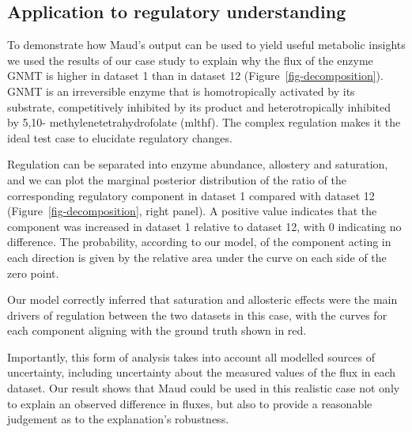\documentclass[journal=asbcd6,manuscript=article,layout=traditional]{achemso}
\begin{document}
\hypertarget{application-to-regulatory-understanding}{%
\subsection{Application to regulatory
understanding}\label{application-to-regulatory-understanding}}

To demonstrate how Maud's output can be used to yield useful metabolic
insights we used the results of our case study to explain why the flux
of the enzyme GNMT is higher in dataset 1 than in dataset 12
(Figure~\ref{fig-decomposition}). GNMT is an irreversible enzyme that is
homotropically activated by its substrate, competitively inhibited by
its product and heterotropically inhibited by 5,10-
methylenetetrahydrofolate (mlthf). The complex regulation makes it the
ideal test case to elucidate regulatory changes.

Regulation can be separated into enzyme abundance, allostery and
saturation, and we can plot the marginal posterior distribution of the
ratio of the corresponding regulatory component in dataset 1 compared
with dataset 12 (Figure~\ref{fig-decomposition}, right panel). A
positive value indicates that the component was increased in dataset 1
relative to dataset 12, with 0 indicating no difference. The
probability, according to our model, of the component acting in each
direction is given by the relative area under the curve on each side of
the zero point.

Our model correctly inferred that saturation and allosteric effects were
the main drivers of regulation between the two datasets in this case,
with the curves for each component aligning with the ground truth shown
in red.

Importantly, this form of analysis takes into account all modelled
sources of uncertainty, including uncertainty about the measured values
of the flux in each dataset. Our result shows that Maud could be used in
this realistic case not only to explain an observed difference in
fluxes, but also to provide a reasonable judgement as to the
explanation's robustness.
\end{document}

